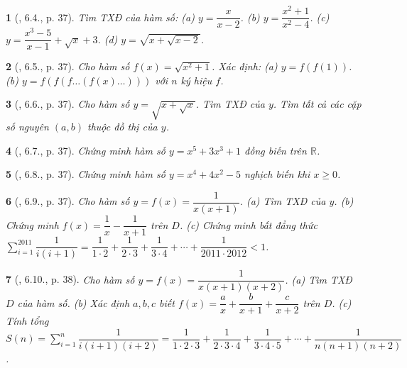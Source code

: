 \documentclass{article}
\newtheorem{baitoan}{}
\begin{document}
\begin{baitoan}[\cite{TLCT_THCS_Toan_9_dai_so}, 6.4., p. 37]
	Tìm {\rm TXĐ} của hàm số: (a) $y = \dfrac{x}{x - 2}$. (b) $y = \dfrac{x^2 + 1}{x^2 - 4}$. (c) $y = \dfrac{x^3 - 5}{x - 1} + \sqrt{x} + 3$. (d) $y = \sqrt{x + \sqrt{x - 2}}$.
\end{baitoan}

\begin{baitoan}[\cite{TLCT_THCS_Toan_9_dai_so}, 6.5., p. 37]
	Cho hàm số $f(x) = \sqrt{x^2 + 1}$. Xác định: (a) $y = f(f(1))$. (b) $y = f(f(f\ldots(f(x)\ldots)))$ với $n$ ký hiệu $f$.
\end{baitoan}

\begin{baitoan}[\cite{TLCT_THCS_Toan_9_dai_so}, 6.6., p. 37]
	Cho hàm số $y = \sqrt{x + \sqrt{x}}$. Tìm {\rm TXĐ} của $y$. Tìm tất cả các cặp số nguyên $(a,b)$ thuộc đồ thị của $y$.
\end{baitoan}

\begin{baitoan}[\cite{TLCT_THCS_Toan_9_dai_so}, 6.7., p. 37]
	Chứng minh hàm số $y = x^5 + 3x^3 + 1$ đồng biến trên $\mathbb{R}$.
\end{baitoan}

\begin{baitoan}[\cite{TLCT_THCS_Toan_9_dai_so}, 6.8., p. 37]
	Chứng minh hàm số $y = x^4 + 4x^2 - 5$ nghịch biến khi $x\ge0$.
\end{baitoan}

\begin{baitoan}[\cite{TLCT_THCS_Toan_9_dai_so}, 6.9., p. 37]
	Cho hàm số $y = f(x) = \dfrac{1}{x(x + 1)}$. (a) Tìm {\rm TXĐ} của $y$. (b) Chứng minh $f(x) = \dfrac{1}{x} - \dfrac{1}{x + 1}$ trên $D$. (c) Chứng minh bất đẳng thức $\sum_{i=1}^{2011} \dfrac{1}{i(i + 1)} = \dfrac{1}{1\cdot2} + \dfrac{1}{2\cdot3} + \dfrac{1}{3\cdot4} + \cdots + \dfrac{1}{2011\cdot2012} < 1$.
\end{baitoan}

\begin{baitoan}[\cite{TLCT_THCS_Toan_9_dai_so}, 6.10., p. 38]
	Cho hàm số $y = f(x) = \dfrac{1}{x(x + 1)(x + 2)}$. (a) Tìm {\rm TXĐ} $D$ của hàm số. (b) Xác định $a,b,c$ biết $f(x) = \dfrac{a}{x} + \dfrac{b}{x + 1} + \dfrac{c}{x + 2}$ trên $D$. (c) Tính tổng $S(n) = \sum_{i=1}^n \dfrac{1}{i(i + 1)(i + 2)} = \dfrac{1}{1\cdot2\cdot3} + \dfrac{1}{2\cdot3\cdot4} + \dfrac{1}{3\cdot4\cdot5} + \cdots + \dfrac{1}{n(n + 1)(n + 2)}$.
\end{baitoan}
\end{document}
